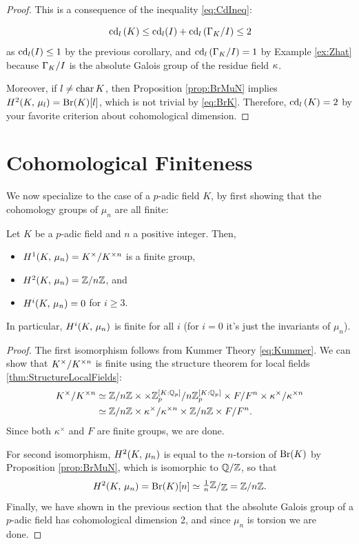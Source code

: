 \documentclass[a4paper, oneside]{memoir}
\begin{document}
\begin{proof}
    This is a consequence of the inequality \ref{eq:CdIneq}:

    \[
        \operatorname{cd}_l{(K)}\leq \operatorname{cd}_l(I)+\operatorname{cd}_l{(\Gamma_K / I)} \leq 2
    \]
    as $\operatorname{cd}_l(I)\leq 1$ by the previous corollary, and $\operatorname{cd}_l{(\Gamma_K / I)} = 1$ by Example \ref{ex:Zhat} because $\Gamma_K / I$ is the absolute Galois group of the residue
    field $\kappa$.

    Moreover, if $l\neq \operatorname{char}{K}$, then Proposition \ref{prop:BrMuN} implies $H^{2}( K, \, \mu_l )=\mathrm{Br}(K)[l]$, which is not trivial by \eqref{eq:BrK}. Therefore, $\operatorname{cd}_l{(K)}=2$ by your favorite criterion about cohomological dimension.
\end{proof}

\section{Cohomological Finiteness}

We now specialize to the case of a $p$-adic field $K$, by first showing that the cohomology groups of $\mu_n$ are all finite:

\begin{theorem}\label{thm:CohomMuN}
    Let $K$ be a $p$-adic field and $n$ a positive integer.
    Then,
    \begin{itemize}
        \item $H^{1}( K, \, \mu_n ) = K^\times/K^{\times n}$ is a finite group,
        \item $H^{2}( K, \, \mu_n ) = \mathbb{Z}/n\mathbb{Z}$, and
        \item $H^{i}( K, \, \mu_n ) = 0$ for $i\geq 3$.
    \end{itemize}
    In particular, $H^{i}( K, \, \mu_n )$ is finite for all $i$ (for $i=0$ it's just the invariants of $\mu_n$).
\end{theorem}
\begin{proof}
    The first isomorphism follows from Kummer Theory \eqref{eq:Kummer}. We can show that $K^\times/K^{\times n}$ is finite using the structure theorem for local fields \ref{thm:StructureLocalFields}:
    \begin{align*}
        K^\times/K^{\times n} & \simeq \mathbb{Z}/n\mathbb{Z} \times  \times \mathbb{Z}_p^{[K:\mathbb{Q}_p]}/n \mathbb{Z}_p^{[K:\mathbb{Q}_p]} \times F/F^n \times  \kappa^\times/\kappa^{\times n} \\
                                & \simeq \mathbb{Z}/n\mathbb{Z} \times \kappa^\times/\kappa^{\times n} \times  \mathbb{Z}/n\mathbb{Z} \times F/F^n.
    \end{align*}
    Since both $\kappa^\times$ and $F$ are finite groups, we are done.

    For second isomorphism, $H^{2}( K, \, \mu_n )$ is equal to the $n$-torsion of $\mathrm{Br}(K)$ by Proposition \ref{prop:BrMuN}, which is isomorphic to $\mathbb{Q}/\mathbb{Z}$, so that
    \[
        \H{2}{\K}{\mu_n} = \Br{\K}[n] \simeq \ssfrac{\frac{1}{n}\Z}{\Z} = \Z/n\Z.
    \]
    Finally, we have shown in the previous section that the absolute Galois group of a $p$-adic field has cohomological dimension 2, and since $\mu_n$ is torsion we are done.
\end{proof}
\end{document}
